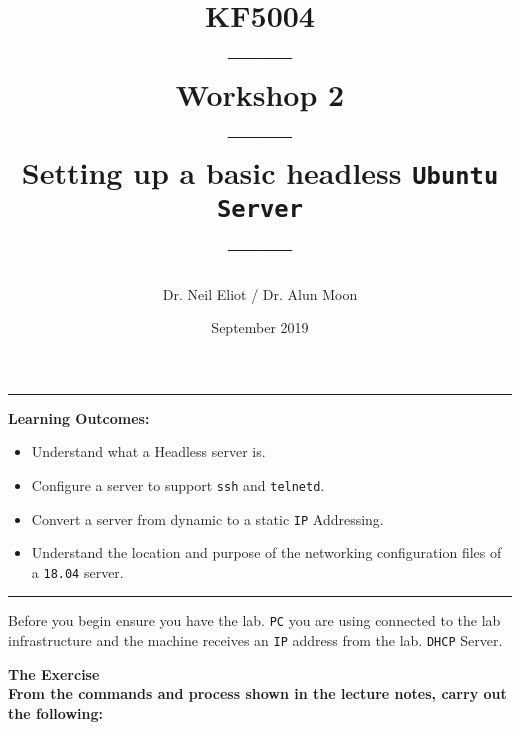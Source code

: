 \documentclass[11pt]{article}
\begin{document}
\author{Dr. Neil Eliot / Dr. Alun Moon}
\title{KF5004\\------\\Workshop 2\\------\\Setting up a basic headless \texttt{Ubuntu Server}\\------}
\date{September 2019}
\maketitle

\medskip

\begin{center}
    \noindent\rule{8cm}{0.4pt}
\end{center}


\noindent\textbf{Learning Outcomes:}
\begin{itemize}
    \item Understand what a Headless server is.
    \item Configure a server to support \texttt{ssh} and \texttt{telnetd}.
    \item Convert a server from dynamic to a static \texttt{IP} Addressing.
    \item Understand the location and purpose of the networking configuration files of a \texttt{18.04} server.
\end{itemize}

\begin{center}
\noindent\rule{8cm}{0.4pt}
\end{center}

\begin{tcolorbox}[title={\textbf{Note:}}]
    Before you begin ensure you have the lab. \texttt{PC} you are using connected to the lab infrastructure and the machine receives an \texttt{IP} address from the lab. \texttt{DHCP} Server.
\end{tcolorbox}

\noindent\textbf{The Exercise}\\

\noindent \textbf{From the commands and process shown in the lecture notes, carry out the following:\\}
\end{document}
